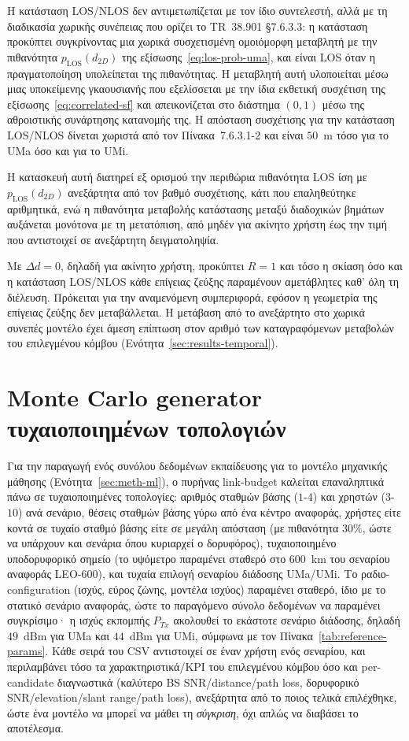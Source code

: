 Η κατάσταση LOS/NLOS δεν αντιμετωπίζεται με τον ίδιο συντελεστή, αλλά με
τη διαδικασία χωρικής συνέπειας που ορίζει το TR~38.901 §7.6.3.3: η
κατάσταση προκύπτει συγκρίνοντας μια χωρικά συσχετισμένη ομοιόμορφη
μεταβλητή με την πιθανότητα $p_{\text{LOS}}(d_{2D})$ της
εξίσωσης~\eqref{eq:los-prob-uma}, και είναι LOS όταν η πραγματοποίηση
υπολείπεται της πιθανότητας. Η μεταβλητή αυτή υλοποιείται μέσω μιας
υποκείμενης γκαουσιανής που εξελίσσεται με την ίδια εκθετική συσχέτιση της
εξίσωσης~\eqref{eq:correlated-sf} και απεικονίζεται στο διάστημα $(0,1)$
μέσω της αθροιστικής συνάρτησης κατανομής της. Η απόσταση συσχέτισης για
την κατάσταση LOS/NLOS δίνεται χωριστά από τον Πίνακα~7.6.3.1-2 και είναι
$50$~m τόσο για το UMa όσο και για το UMi.

Η κατασκευή αυτή διατηρεί εξ ορισμού την περιθώρια πιθανότητα LOS ίση με
$p_{\text{LOS}}(d_{2D})$ ανεξάρτητα από τον βαθμό συσχέτισης, κάτι που
επαληθεύτηκε αριθμητικά, ενώ η πιθανότητα μεταβολής κατάστασης μεταξύ
διαδοχικών βημάτων αυξάνεται μονότονα με τη μετατόπιση, από μηδέν για
ακίνητο χρήστη έως την τιμή που αντιστοιχεί σε ανεξάρτητη δειγματοληψία.

Με $\Delta d = 0$, δηλαδή για ακίνητο χρήστη, προκύπτει $R = 1$ και τόσο η
σκίαση όσο και η κατάσταση LOS/NLOS κάθε επίγειας ζεύξης παραμένουν
αμετάβλητες καθ' όλη τη διέλευση. Πρόκειται για την αναμενόμενη
συμπεριφορά, εφόσον η γεωμετρία της επίγειας ζεύξης δεν μεταβάλλεται. Η
μετάβαση από το ανεξάρτητο στο χωρικά συνεπές μοντέλο έχει άμεση επίπτωση
στον αριθμό των καταγραφόμενων μεταβολών του επιλεγμένου κόμβου
(Ενότητα~\ref{sec:results-temporal}).

\section{Monte Carlo generator τυχαιοποιημένων τοπολογιών}
\label{sec:meth-montecarlo}

Για την παραγωγή ενός συνόλου δεδομένων εκπαίδευσης για το μοντέλο
μηχανικής μάθησης (Ενότητα~\ref{sec:meth-ml}), ο πυρήνας link-budget
καλείται επαναληπτικά πάνω σε τυχαιοποιημένες τοπολογίες: αριθμός σταθμών
βάσης ($1$-$4$) και χρηστών ($3$-$10$) ανά σενάριο, θέσεις σταθμών βάσης
γύρω από ένα κέντρο αναφοράς, χρήστες είτε κοντά σε τυχαίο σταθμό βάσης
είτε σε μεγάλη απόσταση (με πιθανότητα $30\%$, ώστε να υπάρχουν και
σενάρια όπου κυριαρχεί ο δορυφόρος), τυχαιοποιημένο υποδορυφορικό σημείο
(το υψόμετρο παραμένει σταθερό στο $600$~km του σεναρίου αναφοράς LEO-600),
και τυχαία επιλογή σεναρίου διάδοσης UMa/UMi. Το ραδιο-configuration
(ισχύς, εύρος ζώνης, μοντέλα ισχύος) παραμένει σταθερό, ίδιο με το στατικό
σενάριο αναφοράς, ώστε το παραγόμενο σύνολο δεδομένων να παραμένει
συγκρίσιμο· η ισχύς εκπομπής $P_{Tx}$ ακολουθεί το εκάστοτε σενάριο
διάδοσης, δηλαδή $49$~dBm για UMa και $44$~dBm για UMi, σύμφωνα με τον
Πίνακα~\ref{tab:reference-params}.
Κάθε σειρά του CSV αντιστοιχεί σε έναν χρήστη ενός σεναρίου, και
περιλαμβάνει τόσο τα χαρακτηριστικά/KPI του επιλεγμένου κόμβου όσο και
per-candidate διαγνωστικά (καλύτερο BS SNR/distance/path loss, δορυφορικό
SNR/elevation/slant range/path loss), ανεξάρτητα από το ποιος τελικά
επιλέχθηκε, ώστε ένα μοντέλο να μπορεί να μάθει τη \emph{σύγκριση}, όχι
απλώς να διαβάσει το αποτέλεσμα.


